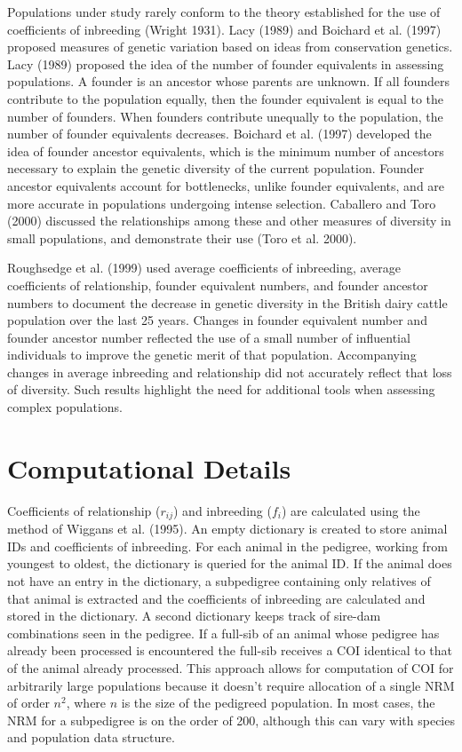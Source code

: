 \documentclass[
  letterpaper,
  DIV=11,
  numbers=noendperiod]{scrreprt}
\begin{document}
Populations under study rarely conform to the theory established for the
use of coefficients of inbreeding (Wright 1931). Lacy (1989) and
Boichard et al. (1997) proposed measures of genetic variation based on
ideas from conservation genetics. Lacy (1989) proposed the idea of the
number of founder equivalents in assessing populations. A founder is an
ancestor whose parents are unknown. If all founders contribute to the
population equally, then the founder equivalent is equal to the number
of founders. When founders contribute unequally to the population, the
number of founder equivalents decreases. Boichard et al. (1997)
developed the idea of founder ancestor equivalents, which is the minimum
number of ancestors necessary to explain the genetic diversity of the
current population. Founder ancestor equivalents account for
bottlenecks, unlike founder equivalents, and are more accurate in
populations undergoing intense selection. Caballero and Toro (2000)
discussed the relationships among these and other measures of diversity
in small populations, and demonstrate their use (Toro et al. 2000).

Roughsedge et al. (1999) used average coefficients of inbreeding,
average coefficients of relationship, founder equivalent numbers, and
founder ancestor numbers to document the decrease in genetic diversity
in the British dairy cattle population over the last 25 years. Changes
in founder equivalent number and founder ancestor number reflected the
use of a small number of influential individuals to improve the genetic
merit of that population. Accompanying changes in average inbreeding and
relationship did not accurately reflect that loss of diversity. Such
results highlight the need for additional tools when assessing complex
populations.

\section{Computational
Details}\label{sec-methodology-computational-details}

Coefficients of relationship (\(r_{ij}\)) and inbreeding (\(f_{i}\)) are
calculated using the method of Wiggans et al. (1995). An empty
dictionary is created to store animal IDs and coefficients of
inbreeding. For each animal in the pedigree, working from youngest to
oldest, the dictionary is queried for the animal ID. If the animal does
not have an entry in the dictionary, a subpedigree containing only
relatives of that animal is extracted and the coefficients of inbreeding
are calculated and stored in the dictionary. A second dictionary keeps
track of sire-dam combinations seen in the pedigree. If a full-sib of an
animal whose pedigree has already been processed is encountered the
full-sib receives a COI identical to that of the animal already
processed. This approach allows for computation of COI for arbitrarily
large populations because it doesn't require allocation of a single NRM
of order \(n^{2}\), where \(n\) is the size of the pedigreed population.
In most cases, the NRM for a subpedigree is on the order of 200,
although this can vary with species and population data structure.
\end{document}
